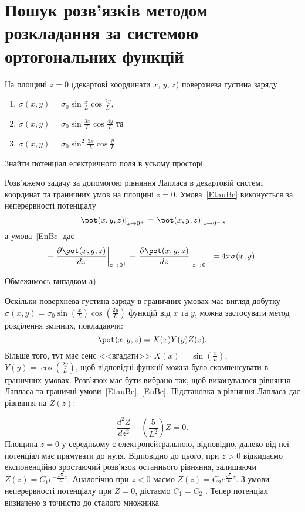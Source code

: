 \section{Пошук розв'язків методом розкладання за системою ортогональних функцій}
\begin{problem}\label{prb:charged_plates}
На площині $z=0$ (декартові координати $x$, $y$, $z$) поверхнева густина заряду
\begin{enumerate}[label=\alph*)]
	\item $\sigma(x, y) = \sigma_0 \sin\frac{x}{L}\cos\frac{2y}{L}$,
	\item  $\sigma(x, y) = \sigma_0 \sin\frac{3x}{L}\cos\frac{4y}{L}$ та
	\item  $\sigma(x, y) = \sigma_0 \sin^2\frac{3x}{L}\cos\frac{y}{L}$
\end{enumerate}
Знайти потенціал електричного поля в усьому просторі.
\begin{solution}
    Розв'яжемо задачу за допомогою рівняння Лапласа в декартовій системі координат  та граничних умов на площині $z = 0$. Умова~\eqref{EtauBc} виконується за неперервності потенціалу
	\begin{equation*}\label{continuity}
		\left.\pot(x,y,z)\right|_{z \to 0^+} = \left.\pot(x,y,z)\right|_{z \to 0^-},
	\end{equation*}
	а умова~\eqref{EnBc} дає
	\begin{equation*}\label{boundary}
		-\left. \frac{\partial \pot(x,y,z)}{dz}\right|_{z \to 0^+} + \left. \frac{\partial \pot(x,y,z)}{dz}\right|_{z \to 0^-} =4\pi\sigma(x,y).
	\end{equation*}

	Обмежимось випадком а).

	Оскільки поверхнева густина заряду в граничних умовах має вигляд добутку $\sigma(x, y) = \sigma_0 \sin\left( \frac{x}{L}\right) \cos\left( \frac{2y}{L}\right) $ функцій від $x$ та $y$, можна застосувати метод розділення змінних, покладаючи:
    \[
        \pot(x,y,z) = X(x)Y(y)Z(z).
    \]
Більше того, тут має сенс <<вгадати>> $X(x) = \sin\left(\frac{x}{L}\right) $, $Y(y) =
\cos\left(\frac{2y}{L}\right) $, щоб відповідні функції можна було скомпенсувати в граничних умовах.
Розв'язок має бути вибрано так, щоб виконувалося рівняння Лапласа та граничні умови~\eqref{EtauBc},
\eqref{EnBc}.%
Підстановка в рівняння Лапласа дає рівняння на $Z(z)$:

\begin{equation*}
    \frac{d^2Z}{dz^2} - \left( \frac{5}{L^2}\right) Z = 0.
\end{equation*}
Площина  $z = 0$ у середньому є електронейтральною, відповідно, далеко від неї потенціал має прямувати до нуля. Відповідно до цього, при $z >0$  відкидаємо експоненційно зростаючий розв’язок останнього рівняння, залишаючи $ Z(z) = C_1  e^{-\frac{\sqrt5}{L}z} $. Аналогічно при $z < 0$  маємо $ Z(z) = C_2  e^{\frac{\sqrt5}{L}z} $. З умови неперервності потенціалу при $Z = 0$, дістаємо $C_1 = C_2$ . Тепер потенціал визначено з точністю до сталого множника



\end{solution}
\end{problem}
